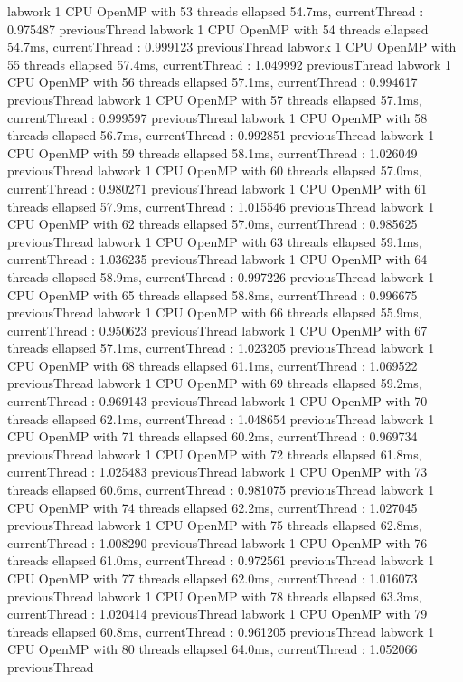 labwork 1 CPU OpenMP with 53 threads ellapsed 54.7ms, currentThread : 0.975487 previousThread
labwork 1 CPU OpenMP with 54 threads ellapsed 54.7ms, currentThread : 0.999123 previousThread
labwork 1 CPU OpenMP with 55 threads ellapsed 57.4ms, currentThread : 1.049992 previousThread
labwork 1 CPU OpenMP with 56 threads ellapsed 57.1ms, currentThread : 0.994617 previousThread
labwork 1 CPU OpenMP with 57 threads ellapsed 57.1ms, currentThread : 0.999597 previousThread
labwork 1 CPU OpenMP with 58 threads ellapsed 56.7ms, currentThread : 0.992851 previousThread
labwork 1 CPU OpenMP with 59 threads ellapsed 58.1ms, currentThread : 1.026049 previousThread
labwork 1 CPU OpenMP with 60 threads ellapsed 57.0ms, currentThread : 0.980271 previousThread
labwork 1 CPU OpenMP with 61 threads ellapsed 57.9ms, currentThread : 1.015546 previousThread
labwork 1 CPU OpenMP with 62 threads ellapsed 57.0ms, currentThread : 0.985625 previousThread
labwork 1 CPU OpenMP with 63 threads ellapsed 59.1ms, currentThread : 1.036235 previousThread
labwork 1 CPU OpenMP with 64 threads ellapsed 58.9ms, currentThread : 0.997226 previousThread
labwork 1 CPU OpenMP with 65 threads ellapsed 58.8ms, currentThread : 0.996675 previousThread
labwork 1 CPU OpenMP with 66 threads ellapsed 55.9ms, currentThread : 0.950623 previousThread
labwork 1 CPU OpenMP with 67 threads ellapsed 57.1ms, currentThread : 1.023205 previousThread
labwork 1 CPU OpenMP with 68 threads ellapsed 61.1ms, currentThread : 1.069522 previousThread
labwork 1 CPU OpenMP with 69 threads ellapsed 59.2ms, currentThread : 0.969143 previousThread
labwork 1 CPU OpenMP with 70 threads ellapsed 62.1ms, currentThread : 1.048654 previousThread
labwork 1 CPU OpenMP with 71 threads ellapsed 60.2ms, currentThread : 0.969734 previousThread
labwork 1 CPU OpenMP with 72 threads ellapsed 61.8ms, currentThread : 1.025483 previousThread
labwork 1 CPU OpenMP with 73 threads ellapsed 60.6ms, currentThread : 0.981075 previousThread
labwork 1 CPU OpenMP with 74 threads ellapsed 62.2ms, currentThread : 1.027045 previousThread
labwork 1 CPU OpenMP with 75 threads ellapsed 62.8ms, currentThread : 1.008290 previousThread
labwork 1 CPU OpenMP with 76 threads ellapsed 61.0ms, currentThread : 0.972561 previousThread
labwork 1 CPU OpenMP with 77 threads ellapsed 62.0ms, currentThread : 1.016073 previousThread
labwork 1 CPU OpenMP with 78 threads ellapsed 63.3ms, currentThread : 1.020414 previousThread
labwork 1 CPU OpenMP with 79 threads ellapsed 60.8ms, currentThread : 0.961205 previousThread
labwork 1 CPU OpenMP with 80 threads ellapsed 64.0ms, currentThread : 1.052066 previousThread
